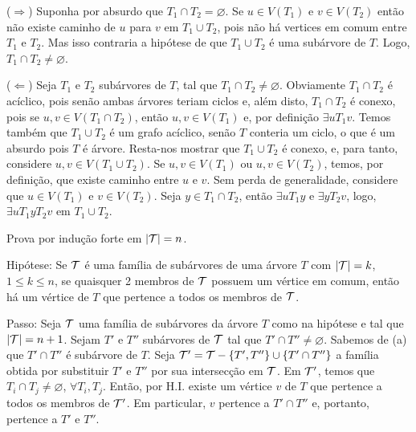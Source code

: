
($\Rightarrow$) Suponha por absurdo que $T_1 \cap T_2 = \varnothing$.
%
Se $u \in V(T_1)$ e $v \in V(T_2)$ então não existe caminho de $u$ para $v$ em $T_1 \cup T_2$, pois não há vertices em comum entre $T_1$ e $T_2$.
%
Mas isso contraria a hipótese de que $T_1 \cup T_2$ é uma subárvore de $T$.
%
Logo, $T_1 \cap T_2 \ne \varnothing$.

($\Leftarrow$) Seja $T_1$ e $T_2$ subárvores de $T$, tal que $T_1 \cap T_2 \ne \varnothing$. 
%
Obviamente $T_1 \cap T_2$ é acíclico, pois senão ambas árvores teriam ciclos e, além disto, $T_1 \cap T_2$ é conexo, pois se $u,v \in V(T_1 \cap T_2)$, então $u,v \in V(T_1)$ e, por definição $\exists uT_1v$.
%
Temos também que $T_1 \cup T_2$ é um grafo acíclico, senão $T$ conteria um ciclo, o que é um absurdo pois $T$ é árvore.
%
Resta-nos mostrar que $T_1 \cup T_2$ é conexo, e,  para tanto, considere $u,v \in V(T_1 \cup T_2)$.
%
Se $u,v \in V(T_1)$ ou $u,v \in V(T_2)$, temos, por definição, que existe caminho entre $u$ e $v$.
%
Sem perda de generalidade, considere que $u \in V(T_1)$ e $v \in V(T_2)$.
%
Seja $y \in T_1 \cap T_2$, então $\exists uT_1y$ e $\exists yT_2v$, logo, $\exists uT_1yT_2v$ em $T_1 \cup T_2$.
\fimprova

Prova por indução forte em $|{\cal T}| = n$.

Hipótese: Se ${\cal T}$ é uma família de subárvores de uma árvore $T$ com
$|{\cal T}| = k$, $ 1 \le k \le n$, se quaisquer 2 membros de ${\cal T}$ possuem
um vértice em comum, então há um vértice de $T$ que pertence a todos os membros
de ${\cal T}$.

Passo: Seja ${\cal T}$ uma família de subárvores da árvore $T$ como na hipótese e
tal que $|{\cal T}| = n + 1$. Sejam $T'$ e $T''$ subárvores de ${\cal T}$ tal que
$T' \cap T'' \ne \varnothing$. Sabemos de (a) que $T' \cap T''$ é subárvore de $T$.
Seja ${\cal T'} = {\cal T} - \{T', T''\} \cup \{T' \cap T''\}$ a família obtida
por substituir $T'$ e $T''$ por sua intersecção em ${\cal T}$. Em ${\cal T'}$,
temos que $T_i \cap T_j \ne \varnothing$, $\forall T_i, T_j$. Então, por H.I.
existe um vértice $v$ de $T$ que pertence a todos os membros de ${\cal T'}$. Em
particular, $v$ pertence a $T' \cap T''$ e, portanto, pertence a $T'$ e $T''$.
\fimprova
